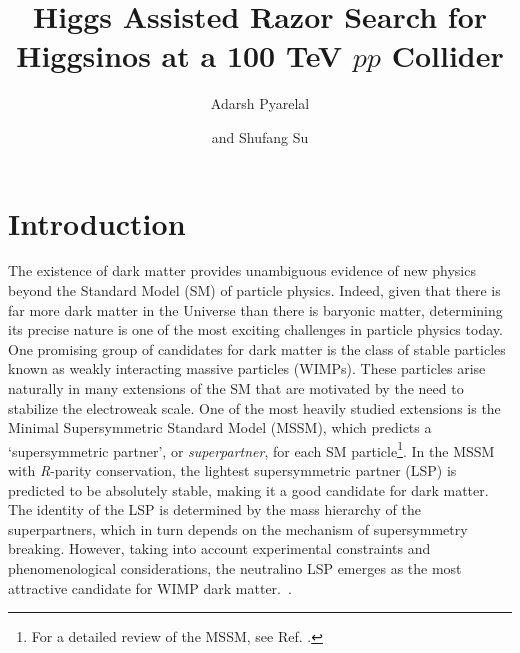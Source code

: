 \documentclass[a4paper,11pt]{article}
\title{Higgs Assisted Razor Search for Higgsinos at a 100 TeV $pp$ Collider}
\author[a]{Adarsh Pyarelal}
\author[b]{and Shufang Su}
\affiliation[a]{School of Information, University of Arizona, Tucson, AZ 85721 , USA}
\affiliation[b]{Department of Physics, University of Arizona, Tucson, AZ 85718, USA}
\begin{document}
\maketitle

\section{Introduction}

The existence of dark matter provides unambiguous evidence of new physics
beyond the Standard Model (SM) of particle physics. Indeed, given that there is
far more dark matter in the Universe than there is baryonic matter, determining
its precise nature is one of the most exciting challenges in particle physics
today.  One promising group of candidates for dark matter is the class of
stable particles known as weakly interacting massive particles (WIMPs). These
particles arise naturally in many extensions of the SM that are motivated by
the need to stabilize the electroweak scale. One of the most heavily studied
extensions is the Minimal Supersymmetric Standard Model (MSSM), which predicts
a `supersymmetric partner', or \emph{superpartner}, for each SM
particle\footnote{For a detailed review of the MSSM, see Ref.
\cite{Martin:1997ns}.}. In the MSSM with \emph{R}-parity conservation, the
lightest supersymmetric partner (LSP) is predicted to be absolutely stable,
making it a good candidate for dark matter. The identity of the LSP is
determined by the mass hierarchy of the superpartners, which in turn depends on
the mechanism of supersymmetry breaking.  However, taking into account
experimental constraints and phenomenological considerations, the neutralino
LSP emerges as the most attractive candidate for WIMP dark
matter.~\cite{Bertone:2004pz}. 
\end{document}
